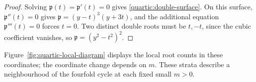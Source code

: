\begin{proof}
Solving $\mathfrak p(t)=\mathfrak p'(t)=0$ gives \eqref{quartic:double-surface}.
On this surface, $\mathfrak p''(t)=0$ gives $\mathfrak p=(y-t)^3(y+3t)$,
and the additional equation $\mathfrak p'''(t)=0$ forces $t=0$.
Two distinct double roots must be $t,-t$, since the cubic coefficient
vanishes, so $\mathfrak p=(y^2-t^2)^2$.
\end{proof}

Figure~\ref{fig:quartic-local-diagram} displays the local root counts in these
coordinates; the coordinate change depends on $m$. These strata describe a
neighbourhood of the fourfold cycle at each fixed small $m>0$.


\FloatBarrier
